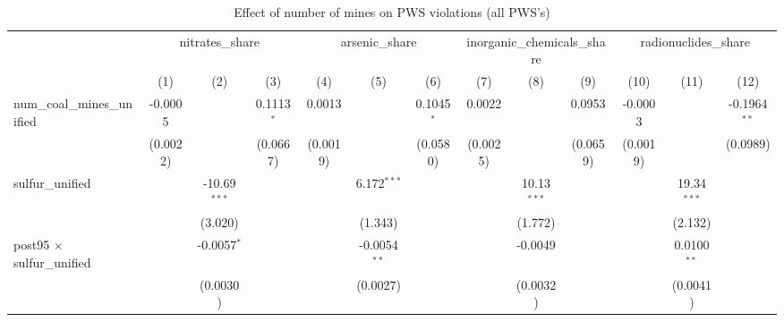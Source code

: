 
\begin{table}[htbp]
   \caption{\label{olsrf2sls_nummine_mine_vio_1985to2005allhucs_coalunified} Effect of number of mines on PWS violations (all PWS's)}
   \bigskip
   \centering
   \begin{adjustbox}{width = \textwidth, center}
      \begin{tabular}{lcccccccccccc}
         \toprule
          & \multicolumn{3}{c}{nitrates\_share} & \multicolumn{3}{c}{arsenic\_share} & \multicolumn{3}{c}{inorganic\_chemicals\_share} & \multicolumn{3}{c}{radionuclides\_share}\\
                                                          & (1)                   & (2)            & (3)           & (4)                   & (5)            & (6)           & (7)           & (8)           & (9)           & (10)                  & (11)          & (12)\\  
         \midrule 
         num\_coal\_mines\_unified                        & -0.0005               &                & 0.1113$^{*}$  & 0.0013                &                & 0.1045$^{*}$  & 0.0022        &               & 0.0953        & -0.0003               &               & -0.1964$^{**}$\\   
                                                          & (0.0022)              &                & (0.0667)      & (0.0019)              &                & (0.0580)      & (0.0025)      &               & (0.0659)      & (0.0019)              &               & (0.0989)\\   
         sulfur\_unified                                  &                       & -10.69$^{***}$ &               &                       & 6.172$^{***}$  &               &               & 10.13$^{***}$ &               &                       & 19.34$^{***}$ &   \\   
                                                          &                       & (3.020)        &               &                       & (1.343)        &               &               & (1.772)       &               &                       & (2.132)       &   \\   
         post95 $\times$ sulfur\_unified                  &                       & -0.0057$^{*}$  &               &                       & -0.0054$^{**}$ &               &               & -0.0049       &               &                       & 0.0100$^{**}$ &   \\   
                                                          &                       & (0.0030)       &               &                       & (0.0027)       &               &               & (0.0032)      &               &                       & (0.0041)      &   \\   

\end{tabular}
\end{adjustbox}
\end{table}
